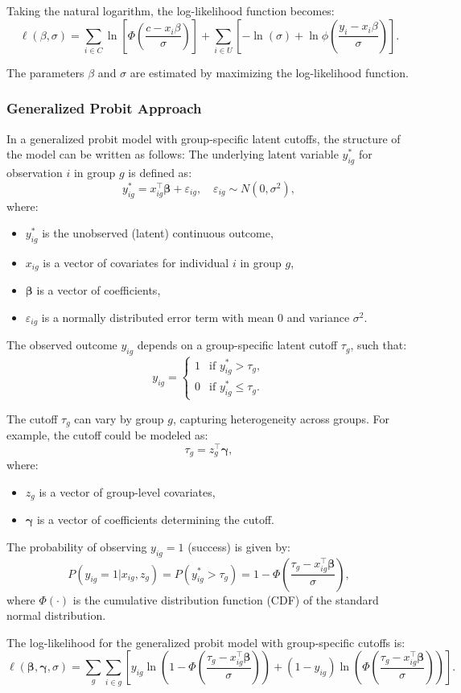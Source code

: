 Taking the natural logarithm, the log-likelihood function becomes:
\[
\ell(\beta, \sigma) = \sum_{i \in C} \ln \left[ \Phi\left( \frac{c - x_i \beta}{\sigma} \right) \right]
+ \sum_{i \in U} \left[ -\ln(\sigma) + \ln \phi\left( \frac{y_i - x_i \beta}{\sigma} \right) \right].
\]

The parameters \( \beta \) and \( \sigma \) are estimated by maximizing the log-likelihood function.

\subsubsection{Generalized Probit Approach}
In a generalized probit model with group-specific latent cutoffs, the structure of the model can be written as follows:
The underlying latent variable \( y_{ig}^* \) for observation \( i \) in group \( g \) is defined as:
\[
y_{ig}^* = x_{ig}^\top \bm{\beta} + \varepsilon_{ig}, \quad \varepsilon_{ig} \sim N(0, \sigma^2),
\]
where:
\begin{itemize}
    \item \( y_{ig}^* \) is the unobserved (latent) continuous outcome,
    \item \( x_{ig} \) is a vector of covariates for individual \( i \) in group \( g \),
    \item \( \bm{\beta} \) is a vector of coefficients,
    \item \( \varepsilon_{ig} \) is a normally distributed error term with mean 0 and variance \( \sigma^2 \).
\end{itemize}

The observed outcome \( y_{ig} \) depends on a group-specific latent cutoff \( \tau_g \), such that:
\[
y_{ig} = 
\begin{cases}
1 & \text{if } y_{ig}^* > \tau_g, \\
0 & \text{if } y_{ig}^* \leq \tau_g.
\end{cases}
\]

The cutoff \( \tau_g \) can vary by group \( g \), capturing heterogeneity across groups. For example, the cutoff could be modeled as:
\[
\tau_g = z_g^\top \bm{\gamma},
\]
where:
\begin{itemize}
    \item \( z_g \) is a vector of group-level covariates,
    \item \( \bm{\gamma} \) is a vector of coefficients determining the cutoff.
\end{itemize}

The probability of observing \( y_{ig} = 1 \) (success) is given by:
\[
P(y_{ig} = 1 | x_{ig}, z_g) = P(y_{ig}^* > \tau_g) = 1 - \Phi\left( \frac{\tau_g - x_{ig}^\top \bm{\beta}}{\sigma} \right),
\]
where \( \Phi(\cdot) \) is the cumulative distribution function (CDF) of the standard normal distribution.

The log-likelihood for the generalized probit model with group-specific cutoffs is:
\[
\ell(\bm{\beta}, \bm{\gamma}, \sigma) = \sum_{g} \sum_{i \in g} \left[
y_{ig} \ln \left( 1 - \Phi\left( \frac{\tau_g - x_{ig}^\top \bm{\beta}}{\sigma} \right) \right) 
+ (1 - y_{ig}) \ln \left( \Phi\left( \frac{\tau_g - x_{ig}^\top \bm{\beta}}{\sigma} \right) \right)
\right].
\]
